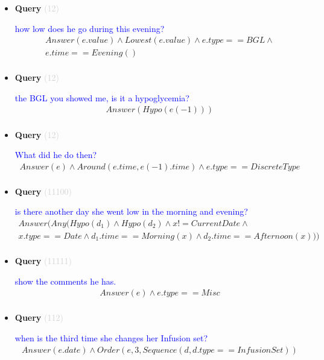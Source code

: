 \documentclass[11pt]{article}
\newcommand{\key}[1]{\textcolor{lightgray}{#1}}
\newcounter{CQuery}
\begin{document}
\begin{itemize}
\item
\textbf{Query\theCQuery} \key{(12)} \addtocounter{CQuery}{1}
\textcolor{blue}{ how low does he go during this evening? }
\begin{multline*}
Answer(e.value) \wedge Lowest(e.value) \wedge e.type==BGL \wedge \\ 
e.time==Evening() \\ 
\end{multline*}


\item
\textbf{Query\theCQuery} \key{(12)} \addtocounter{CQuery}{1}
\textcolor{blue}{ the BGL you showed me, is it a hypoglycemia? }
\begin{multline*}
Answer(Hypo(e(-1))) \\ 
\end{multline*}


\item
\textbf{Query\theCQuery} \key{(12)} \addtocounter{CQuery}{1}
\textcolor{blue}{ What did he do then? }
\begin{multline*}
Answer(e) \wedge Around(e.time, e(-1).time) \wedge e.type==DiscreteType \\ 
\end{multline*}


\item
\textbf{Query\theCQuery} \key{(11100)} \addtocounter{CQuery}{1}
\textcolor{blue}{ is there another day she went low in the morning and evening? }
\begin{multline*}
Answer(Any(Hypo(d_1) \wedge Hypo(d_2) \wedge x != CurrentDate \wedge \\ 
x.type==Date \wedge d_1.time==Morning(x) \wedge d_2.time==Afternoon(x))) \\ 
\end{multline*}


\item
\textbf{Query\theCQuery} \key{(11111)} \addtocounter{CQuery}{1}
\textcolor{blue}{ show the comments he has. }
\begin{multline*}
Answer(e) \wedge e.type==Misc \\ 
\end{multline*}


\item
\textbf{Query\theCQuery} \key{(112)} \addtocounter{CQuery}{1}
\textcolor{blue}{ when is the third time she changes her Infusion set? }
\begin{multline*}
Answer(e.date) \wedge Order(e, 3, Sequence(d, d.type==InfusionSet)) \\ 
\end{multline*}



\end{itemize}
\end{document}
